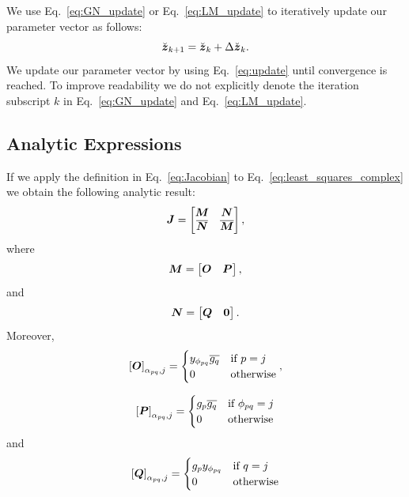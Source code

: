 \documentclass[useAMS,usenatbib]{mn2e}
\newcommand{\bz}{\bmath{z}}
\newcommand{\bJ}{\bmath{J}}
\newcommand{\bN}{\bmath{N}}
\newcommand{\bM}{\bmath{M}}
\newcommand{\bO}{\bmath{O}}
\newcommand{\bP}{\bmath{P}}
\newcommand{\bQ}{\bmath{Q}}
\newcommand{\bzero}{\bmath{0}}
\newcommand{\conj}[1]{\overline{#1}}
\begin{document}
We use Eq.~\eqref{eq:GN_update} or Eq.~\eqref{eq:LM_update} to iteratively update our 
parameter vector as follows:
\begin{equation}
\label{eq:update}
\breve{\bz}_{k+1} = \breve{\bz}_{k} + \Delta \breve{\bz}_{k}. 
\end{equation}
We update our parameter vector by using Eq.~\eqref{eq:update} until convergence is reached. To improve readability we do not explicitly denote the iteration subscript $k$ in 
Eq.~\eqref{eq:GN_update} and Eq.~\eqref{eq:LM_update}.

\subsection{Analytic Expressions}
If we apply the definition in Eq.~\eqref{eq:Jacobian} to Eq.~\eqref{eq:least_squares_complex} we obtain the following analytic result:
\begin{equation}
\label{eq:Jacobian_red}
\bJ = \begin{bmatrix}
       \bM & \bN\\
       \conj{\bN} & \conj{\bM}
      \end{bmatrix},
\end{equation}
where
\begin{equation}
\bM =\begin{bmatrix}
      \bO & \bP
     \end{bmatrix},
\end{equation}
and 
\begin{equation}
\bN = \begin{bmatrix}
       \bQ & \bzero
      \end{bmatrix}.
\end{equation}
Moreover,
\begin{equation}
\left [ \bO  \right ]_{\alpha_{pq},j} = \begin{cases}
                                         y_{\phi_{pq}}\conj{g_q} & \textrm{if}~p=j\\
                                         0  & \textrm{otherwise} 
                                        \end{cases},
\end{equation}

\begin{equation}
\left [ \bP  \right ]_{\alpha_{pq},j} = \begin{cases}
                                         g_p\conj{g_q} & \textrm{if}~\phi_{pq}=j\\
                                         0  & \textrm{otherwise} 
                                        \end{cases}
\end{equation}
and
\begin{equation}
\left [ \bQ  \right ]_{\alpha_{pq},j} = \begin{cases}
                                         g_py_{\phi_{pq}} & \textrm{if}~q=j\\
                                         0  & \textrm{otherwise} 
                                        \end{cases}
\end{equation}
\end{document}
